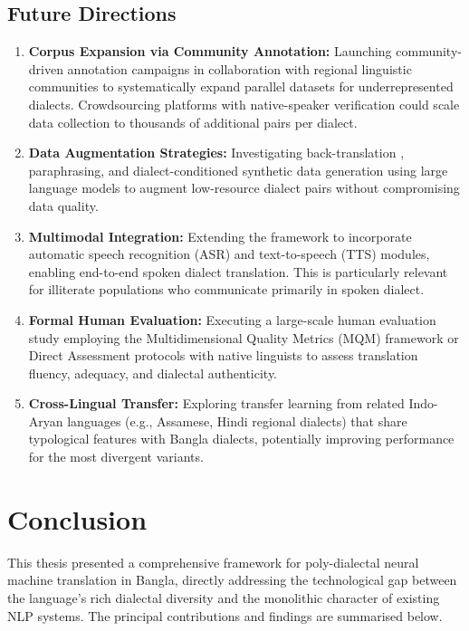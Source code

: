 \documentclass[12pt,a4paper]{article}
\begin{document}
\subsection{Future Directions}
\begin{enumerate}[leftmargin=*]
    \item \textbf{Corpus Expansion via Community Annotation:} Launching community-driven annotation campaigns in collaboration with regional linguistic communities to systematically expand parallel datasets for underrepresented dialects. Crowdsourcing platforms with native-speaker verification could scale data collection to thousands of additional pairs per dialect.
    \item \textbf{Data Augmentation Strategies:} Investigating back-translation \cite{sennrich-etal-2016-improving}, paraphrasing, and dialect-conditioned synthetic data generation using large language models \cite{brown2020language, touvron2023llama} to augment low-resource dialect pairs without compromising data quality.
    \item \textbf{Multimodal Integration:} Extending the framework to incorporate automatic speech recognition (ASR) \cite{radford2023robust} and text-to-speech (TTS) modules, enabling end-to-end spoken dialect translation. This is particularly relevant for illiterate populations who communicate primarily in spoken dialect.
    \item \textbf{Formal Human Evaluation:} Executing a large-scale human evaluation study employing the Multidimensional Quality Metrics (MQM) framework \cite{burchardt-2013-multidimensional} or Direct Assessment protocols \cite{graham2017machine} with native linguists to assess translation fluency, adequacy, and dialectal authenticity.
    \item \textbf{Cross-Lingual Transfer:} Exploring transfer learning from related Indo-Aryan languages (e.g., Assamese, Hindi regional dialects) that share typological features with Bangla dialects, potentially improving performance for the most divergent variants.
\end{enumerate}



\section{Conclusion}

This thesis presented a comprehensive framework for poly-dialectal neural machine translation in Bangla, directly addressing the technological gap between the language's rich dialectal diversity and the monolithic character of existing NLP systems. The principal contributions and findings are summarised below.
\end{document}
